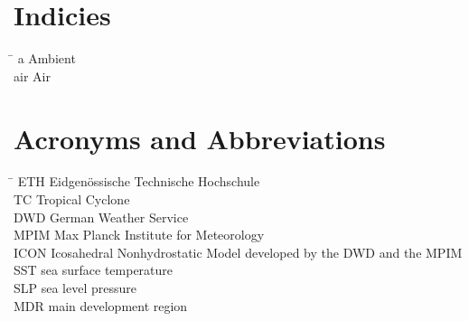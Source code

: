 \section*{Indicies}
\begin{tabbing}
 \hspace*{1.6cm}  \= \kill
 a \> Ambient \\[0.5ex]
 air \> Air
\end{tabbing}

\section*{Acronyms and Abbreviations}
\begin{tabbing}
 \hspace*{1.6cm}  \= \kill
 ETH \> Eidgen\"{o}ssische Technische Hochschule \\[0.5ex]
 TC \> Tropical Cyclone \\[0.5ex]
 DWD \> German Weather Service\\[0.5ex]
 MPIM \> Max Planck Institute for Meteorology\\[0.5ex]
ICON \> Icosahedral Nonhydrostatic Model developed by the DWD and the
MPIM\\[0.5ex]
SST \> sea surface temperature\\[0.5ex]
SLP \> sea level pressure\\[0.5ex]
MDR \> main development region  \\[0.5ex]
\end{tabbing}

